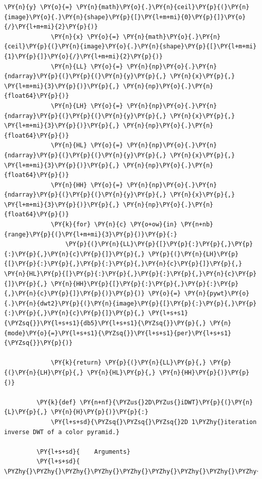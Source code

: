 {\begin{Verbatim}[commandchars=\\\{\}]
             \PY{n}{y} \PY{o}{=} \PY{n}{math}\PY{o}{.}\PY{n}{ceil}\PY{p}{(}\PY{n}{image}\PY{o}{.}\PY{n}{shape}\PY{p}{[}\PY{l+m+mi}{0}\PY{p}{]}\PY{o}{/}\PY{l+m+mi}{2}\PY{p}{)}
             \PY{n}{x} \PY{o}{=} \PY{n}{math}\PY{o}{.}\PY{n}{ceil}\PY{p}{(}\PY{n}{image}\PY{o}{.}\PY{n}{shape}\PY{p}{[}\PY{l+m+mi}{1}\PY{p}{]}\PY{o}{/}\PY{l+m+mi}{2}\PY{p}{)}
             \PY{n}{LL} \PY{o}{=} \PY{n}{np}\PY{o}{.}\PY{n}{ndarray}\PY{p}{(}\PY{p}{(}\PY{n}{y}\PY{p}{,} \PY{n}{x}\PY{p}{,} \PY{l+m+mi}{3}\PY{p}{)}\PY{p}{,} \PY{n}{np}\PY{o}{.}\PY{n}{float64}\PY{p}{)}
             \PY{n}{LH} \PY{o}{=} \PY{n}{np}\PY{o}{.}\PY{n}{ndarray}\PY{p}{(}\PY{p}{(}\PY{n}{y}\PY{p}{,} \PY{n}{x}\PY{p}{,} \PY{l+m+mi}{3}\PY{p}{)}\PY{p}{,} \PY{n}{np}\PY{o}{.}\PY{n}{float64}\PY{p}{)}
             \PY{n}{HL} \PY{o}{=} \PY{n}{np}\PY{o}{.}\PY{n}{ndarray}\PY{p}{(}\PY{p}{(}\PY{n}{y}\PY{p}{,} \PY{n}{x}\PY{p}{,} \PY{l+m+mi}{3}\PY{p}{)}\PY{p}{,} \PY{n}{np}\PY{o}{.}\PY{n}{float64}\PY{p}{)}
             \PY{n}{HH} \PY{o}{=} \PY{n}{np}\PY{o}{.}\PY{n}{ndarray}\PY{p}{(}\PY{p}{(}\PY{n}{y}\PY{p}{,} \PY{n}{x}\PY{p}{,} \PY{l+m+mi}{3}\PY{p}{)}\PY{p}{,} \PY{n}{np}\PY{o}{.}\PY{n}{float64}\PY{p}{)}
             \PY{k}{for} \PY{n}{c} \PY{o+ow}{in} \PY{n+nb}{range}\PY{p}{(}\PY{l+m+mi}{3}\PY{p}{)}\PY{p}{:}
                 \PY{p}{(}\PY{n}{LL}\PY{p}{[}\PY{p}{:}\PY{p}{,}\PY{p}{:}\PY{p}{,}\PY{n}{c}\PY{p}{]}\PY{p}{,} \PY{p}{(}\PY{n}{LH}\PY{p}{[}\PY{p}{:}\PY{p}{,}\PY{p}{:}\PY{p}{,}\PY{n}{c}\PY{p}{]}\PY{p}{,} \PY{n}{HL}\PY{p}{[}\PY{p}{:}\PY{p}{,}\PY{p}{:}\PY{p}{,}\PY{n}{c}\PY{p}{]}\PY{p}{,} \PY{n}{HH}\PY{p}{[}\PY{p}{:}\PY{p}{,}\PY{p}{:}\PY{p}{,}\PY{n}{c}\PY{p}{]}\PY{p}{)}\PY{p}{)} \PY{o}{=} \PY{n}{pywt}\PY{o}{.}\PY{n}{dwt2}\PY{p}{(}\PY{n}{image}\PY{p}{[}\PY{p}{:}\PY{p}{,}\PY{p}{:}\PY{p}{,}\PY{n}{c}\PY{p}{]}\PY{p}{,} \PY{l+s+s1}{\PYZsq{}}\PY{l+s+s1}{db5}\PY{l+s+s1}{\PYZsq{}}\PY{p}{,} \PY{n}{mode}\PY{o}{=}\PY{l+s+s1}{\PYZsq{}}\PY{l+s+s1}{per}\PY{l+s+s1}{\PYZsq{}}\PY{p}{)}
         
             \PY{k}{return} \PY{p}{(}\PY{n}{LL}\PY{p}{,} \PY{p}{(}\PY{n}{LH}\PY{p}{,} \PY{n}{HL}\PY{p}{,} \PY{n}{HH}\PY{p}{)}\PY{p}{)}
         
         \PY{k}{def} \PY{n+nf}{\PYZus{}2D\PYZus{}iDWT}\PY{p}{(}\PY{n}{L}\PY{p}{,} \PY{n}{H}\PY{p}{)}\PY{p}{:}
             \PY{l+s+sd}{\PYZsq{}\PYZsq{}\PYZsq{}2D 1\PYZhy{}iteration inverse DWT of a color pyramid.}
         
         \PY{l+s+sd}{    Arguments}
         \PY{l+s+sd}{    \PYZhy{}\PYZhy{}\PYZhy{}\PYZhy{}\PYZhy{}\PYZhy{}\PYZhy{}\PYZhy{}\PYZhy{}}
         

\end{Verbatim}}
